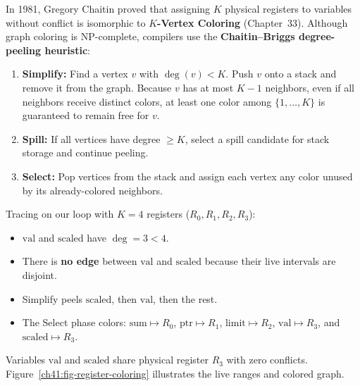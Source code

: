 In 1981, Gregory Chaitin proved that assigning $K$ physical registers to variables
without conflict is isomorphic to \textbf{$K$-Vertex Coloring}
(Chapter~33). Although graph coloring is NP-complete,
compilers use the \textbf{Chaitin--Briggs degree-peeling heuristic}:
\begin{enumerate}
  \item \textbf{Simplify:} Find a vertex $v$ with $\deg(v) < K$. Push $v$ onto a
  stack and remove it from the graph. Because $v$ has at most $K-1$ neighbors,
  even if all neighbors receive distinct colors, at least one color among $\{1,
  \dots, K\}$ is guaranteed to remain free for $v$.
  \item \textbf{Spill:} If all vertices have degree $\ge K$, select a spill candidate
  for stack storage and continue peeling.
  \item \textbf{Select:} Pop vertices from the stack and assign each vertex any
  color unused by its already-colored neighbors.
\end{enumerate}

Tracing on our loop with $K=4$ registers ($R_0, R_1, R_2, R_3$):
\begin{itemize}
  \item $\text{val}$ and $\text{scaled}$ have $\deg = 3 < 4$.
  \item There is \textbf{no edge} between $\text{val}$ and $\text{scaled}$ because their live intervals are disjoint.
  \item Simplify peels $\text{scaled}$, then $\text{val}$, then the rest.
  \item The Select phase colors: $\text{sum} \mapsto R_0$, $\text{ptr} \mapsto R_1$, $\text{limit} \mapsto R_2$, $\text{val} \mapsto R_3$, and $\text{scaled} \mapsto R_3$.
\end{itemize}
Variables $\text{val}$ and $\text{scaled}$ share physical register $R_3$ with
zero conflicts. Figure~\ref{ch41:fig-register-coloring} illustrates the live
ranges and colored graph.

